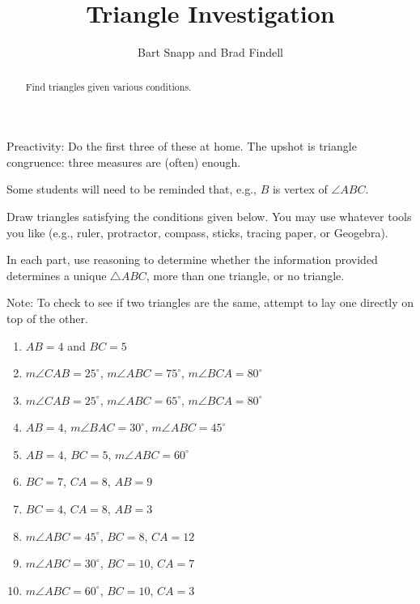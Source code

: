 \documentclass[nooutcomes]{ximera}
\title{Triangle Investigation}
\author{Bart Snapp and Brad Findell}
\begin{document}
\begin{abstract}
  Find triangles given various conditions.
  

\end{abstract}
\maketitle

\begin{teachingnote}
Preactivity:  Do the first three of these at home.  The upshot is triangle congruence:  three measures are (often) enough.  

Some students will need to be reminded that, e.g., $B$ is vertex of $\angle ABC$.
\end{teachingnote}

\begin{problem}
Draw triangles satisfying the conditions given below.  You may use whatever tools you like (e.g., ruler, protractor, compass, sticks, tracing paper, or Geogebra).  

In each part, use reasoning to determine whether the information provided determines a unique $\triangle ABC$, more than one triangle, or no triangle.%

Note:  To check to see if two triangles are the same, attempt to lay one directly on top of the other.  

\begin{enumerate}

\item $AB = 4$ and $BC = 5$
\item $m\angle CAB = 25^\circ$, $m\angle ABC = 75^\circ$, $m\angle BCA = 80^\circ$
\item $m\angle CAB = 25^\circ$, $m\angle ABC = 65^\circ$, $m\angle BCA = 80^\circ$
\item $AB = 4$, $m\angle BAC = 30^\circ$, $m\angle ABC = 45^\circ$
\item $AB = 4$, $BC = 5$, $m\angle ABC = 60^\circ$
\item $BC = 7$, $CA = 8$, $AB = 9$
\item $BC = 4$, $CA = 8$, $AB = 3$
\item $m\angle ABC = 45^\circ$, $BC = 8$, $CA = 12$
\item $m\angle ABC = 30^\circ$, $BC = 10$, $CA = 7$
\item $m\angle ABC = 60^\circ$, $BC = 10$, $CA = 3$

\end{enumerate}

\end{problem}
\end{document}
